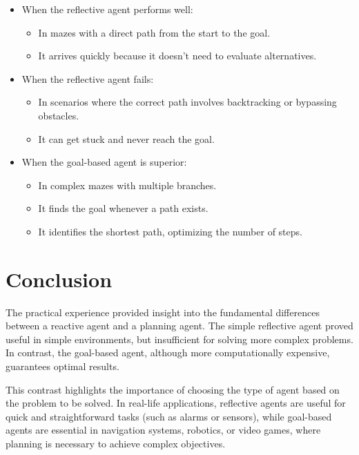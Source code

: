 \documentclass[letterpaper,12pt,oneside]{article}
\begin{document}
\begin{itemize}
    \item When the reflective agent performs well:
    \begin{itemize}
        \item In mazes with a direct path from the start to the goal.
        \item It arrives quickly because it doesn't need to evaluate alternatives.
    \end{itemize}
    \item When the reflective agent fails:
    \begin{itemize}
        \item In scenarios where the correct path involves backtracking or bypassing obstacles.
        \item It can get stuck and never reach the goal.
    \end{itemize}
    \item When the goal-based agent is superior:
    \begin{itemize}
        \item In complex mazes with multiple branches.
        \item It finds the goal whenever a path exists.
        \item It identifies the shortest path, optimizing the number of steps.
    \end{itemize}
\end{itemize}

\section{Conclusion}

The practical experience provided insight into the fundamental differences between a reactive agent and a planning agent. The simple reflective agent proved useful in simple environments, but insufficient for solving more complex problems. In contrast, the goal-based agent, although more computationally expensive, guarantees optimal results.

This contrast highlights the importance of choosing the type of agent based on the problem to be solved. In real-life applications, reflective agents are useful for quick and straightforward tasks (such as alarms or sensors), while goal-based agents are essential in navigation systems, robotics, or video games, where planning is necessary to achieve complex objectives.
\end{document}
